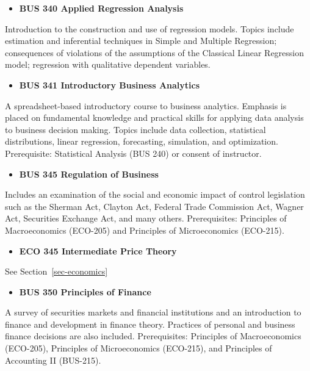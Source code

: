 \documentclass[
  letterpaper,
]{scrbook}
\providecommand{\tightlist}{%
  \setlength{\itemsep}{0pt}\setlength{\parskip}{0pt}}
\begin{document}
\begin{itemize}
\tightlist
\item
  \textbf{BUS 340 Applied Regression Analysis}
\end{itemize}

Introduction to the construction and use of regression models. Topics
include estimation and inferential techniques in Simple and Multiple
Regression; consequences of violations of the assumptions of the
Classical Linear Regression model; regression with qualitative dependent
variables.

\begin{itemize}
\tightlist
\item
  \textbf{BUS 341 Introductory Business Analytics}
\end{itemize}

A spreadsheet-based introductory course to business analytics. Emphasis
is placed on fundamental knowledge and practical skills for applying
data analysis to business decision making. Topics include data
collection, statistical distributions, linear regression, forecasting,
simulation, and optimization. Prerequisite: Statistical Analysis (BUS
240) or consent of instructor.

\begin{itemize}
\tightlist
\item
  \textbf{BUS 345 Regulation of Business}
\end{itemize}

Includes an examination of the social and economic impact of control
legislation such as the Sherman Act, Clayton Act, Federal Trade
Commission Act, Wagner Act, Securities Exchange Act, and many others.
Prerequisites: Principles of Macroeconomics (ECO-205) and Principles of
Microeconomics (ECO-215).

\begin{itemize}
\tightlist
\item
  \textbf{ECO 345 Intermediate Price Theory}
\end{itemize}

See Section~\ref{sec-economics}

\begin{itemize}
\tightlist
\item
  \textbf{BUS 350 Principles of Finance}
\end{itemize}

A survey of securities markets and financial institutions and an
introduction to finance and development in finance theory. Practices of
personal and business finance decisions are also included.
Prerequisites: Principles of Macroeconomics (ECO-205), Principles of
Microeconomics (ECO-215), and Principles of Accounting II (BUS-215).
\end{document}
